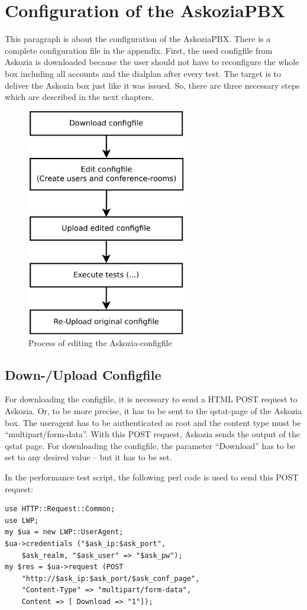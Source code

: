 \section{Configuration of the AskoziaPBX}
\label{sec:configuration}
This paragraph is about the configuration of the AskoziaPBX. There is a complete configuration file in the appendix.
First, the used configfile from Askozia is downloaded because the
user should not have to reconfigure the whole box including all accounts and the dialplan after every test. The target is to deliver
the Askozia box just like it was issued. So, there are three necessary steps which are described in the next chapters.
\begin{figure} [htbp]
\centering
\includegraphics [width=7cm] {config-1}
\caption{Process of editing the Askozia-configfile}
\end{figure}

\subsection{Down-/Upload Configfile}
For downloading the configfile, it is necessary to send a HTML POST request to Askozia. Or, to be more precise, it has to be sent to the qstat-page of the Askozia box. The useragent has to be authenticated as root and the content type must be ``multipart/form-data''. With this POST request, Askozia sends the output of the qstat page. For downloading the configfile, the parameter ``Download'' has to be set to any desired value -- but it has to be set.

In the performance test script, the following perl code is used to send this POST request:
\begin{lstlisting}[breaklines=true,label=code:config-post-request-download,caption={POST request for downloading configfile} ]
use HTTP::Request::Common;
use LWP;
my $ua = new LWP::UserAgent;
$ua->credentials ("$ask_ip:$ask_port",
	$ask_realm, "$ask_user" => "$ask_pw");
my $res = $ua->request (POST
	"http://$ask_ip:$ask_port/$ask_conf_page",
	"Content-Type" => "multipart/form-data",
	Content => [ Download => "1"]);
\end{lstlisting}

